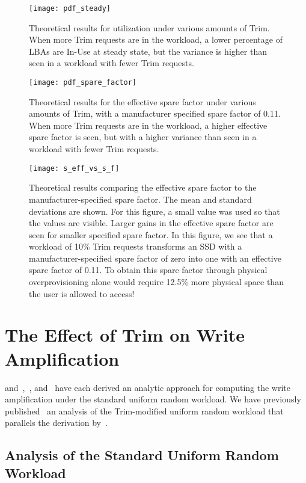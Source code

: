 \documentclass[prodmode,acmtos]{acmsmall}
\begin{document}
\begin{figure}
\centerline{\texttt{[image: pdf\_steady]}}
\caption{Theoretical results for utilization under various amounts of Trim. When more Trim requests are in the workload, a lower percentage of LBAs are In-Use at steady state, but the variance is higher than seen in a workload with fewer Trim requests.}
\label{fig:pdf_steady}
\end{figure}

\begin{figure}
\centerline{\texttt{[image: pdf\_spare\_factor]}}
\caption{Theoretical results for the effective spare factor under various amounts of Trim, with a manufacturer specified spare factor of 0.11. When more Trim requests are in the workload, a higher effective spare factor is seen, but with a higher variance than seen in a workload with fewer Trim requests.}
\label{fig:pdf_spare_factor}
\end{figure}


\begin{figure}
\centerline{\texttt{[image: s\_eff\_vs\_s\_f]}}
\caption{Theoretical results comparing the effective spare factor to the manufacturer-specified spare factor.  The mean and  standard deviations are shown.  For this figure, a small  value was used so that the  values are visible.  Larger gains in the effective spare factor are seen for smaller specified spare factor.  In this figure, we see that a workload of 10\% Trim requests transforms an SSD with a manufacturer-specified spare factor of zero into one with an effective spare factor of 0.11.  To obtain this spare factor through physical overprovisioning alone would require 12.5\% more physical space than the user is allowed to access!}
\label{fig:s_eff_vs_s_f}
\end{figure}

\section{The Effect of Trim on Write Amplification}
 and~,~, and~ have each derived an analytic approach for computing the write amplification under the standard uniform random workload.  We have previously published~\cite{frankie2012_ciit} an analysis of the Trim-modified uniform random workload that parallels the derivation by~.

\subsection{Analysis of the Standard Uniform Random Workload}
\end{document}
